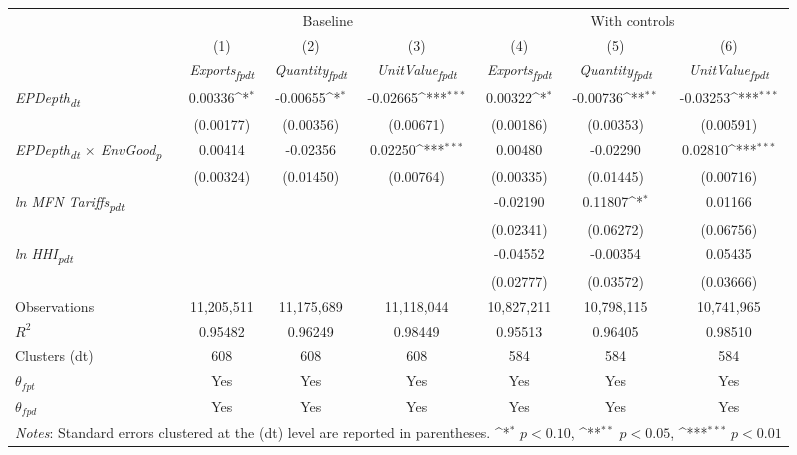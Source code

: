 {
\def\sym#1{\ifmmode^{#1}\else\(^{#1}\)\fi}
\begin{tabular}{l*{6}{c}}
\toprule
&\multicolumn{3}{c}{Baseline}&\multicolumn{3}{c}{With controls}\\\cmidrule(lr){2-4}\cmidrule(lr){5-7}
&(1)&(2)&(3)&(4)&(5)&(6)\\
&\textit{Exports\textsubscript{fpdt}}&\textit{Quantity\textsubscript{fpdt}}&\textit{UnitValue\textsubscript{fpdt}}&\textit{Exports\textsubscript{fpdt}}&\textit{Quantity\textsubscript{fpdt}}&\textit{UnitValue\textsubscript{fpdt}}\\
\midrule
\textit{EPDepth\textsubscript{dt}} & 0.00336\sym{*} & -0.00655\sym{*} & -0.02665\sym{***} & 0.00322\sym{*} & -0.00736\sym{**} & -0.03253\sym{***}\\
 & (0.00177) & (0.00356) & (0.00671) & (0.00186) & (0.00353) & (0.00591)\\
\addlinespace
\textit{EPDepth\textsubscript{dt} $\times$ EnvGood\textsubscript{p}} & 0.00414 & -0.02356 & 0.02250\sym{***} & 0.00480 & -0.02290 & 0.02810\sym{***}\\
 & (0.00324) & (0.01450) & (0.00764) & (0.00335) & (0.01445) & (0.00716)\\
\addlinespace
\textit{ln MFN Tariffs\textsubscript{pdt}} &  &  &  & -0.02190 & 0.11807\sym{*} & 0.01166\\
 &  &  &  & (0.02341) & (0.06272) & (0.06756)\\
\addlinespace
\textit{ln HHI\textsubscript{pdt}} &  &  &  & -0.04552 & -0.00354 & 0.05435\\
 &  &  &  & (0.02777) & (0.03572) & (0.03666)\\
\midrule
Observations & 11,205,511 & 11,175,689 & 11,118,044 & 10,827,211 & 10,798,115 & 10,741,965\\
$R^{2}$ & 0.95482 & 0.96249 & 0.98449 & 0.95513 & 0.96405 & 0.98510\\
Clusters (dt) & 608 & 608 & 608 & 584 & 584 & 584\\
$\theta_{fpt}$ & Yes & Yes & Yes & Yes & Yes & Yes\\
$\theta_{fpd}$ & Yes & Yes & Yes & Yes & Yes & Yes\\
\bottomrule
\multicolumn{7}{l}{\footnotesize \textit{Notes}: Standard errors clustered at the (dt) level are reported in parentheses. \sym{*} \(p<0.10\), \sym{**} \(p<0.05\), \sym{***} \(p<0.01\)}\\
\end{tabular}
}
